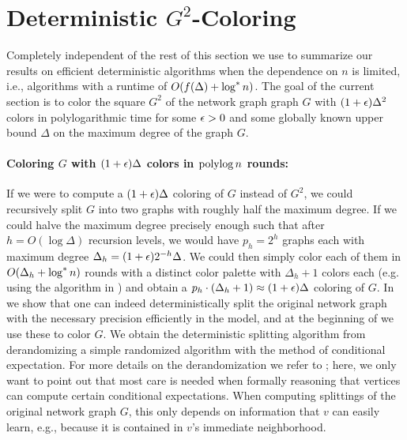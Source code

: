 \section{Deterministic $G^2$-Coloring}
\label{S:det-diam}
Completely independent of the rest of this section we use  to summarize our results on efficient deterministic algorithms when the dependence on $n$ is limited, i.e., algorithms with a runtime of $O(f(\Delta)+\log^* n)$. 
The goal of the current section is to color the square $G^2$ of the network graph graph $G$ with $(1+\epsilon)\Delta^2$ colors in polylogarithmic time for some $\epsilon>0$ and some globally known upper bound $\Delta$ on the maximum degree of the graph $G$. 

\paragraph{Coloring $G$ with $(1+\epsilon)\Delta$ colors in $\operatorname{polylog} n$ rounds:} If we were to compute a $(1+\epsilon)\Delta$ coloring of $G$ instead of $G^2$, we could recursively split $G$ into two graphs with roughly half the maximum degree. If we could halve the maximum degree precisely enough such that after $h=O(\log \Delta)$ recursion levels, we would have $p_h=2^h$ graphs each with maximum degree $\Delta_h=(1+\epsilon)2^{-h}\Delta$. We could then simply color each of them in $O(\Delta_h+\log^* n)$ rounds with a distinct color palette with $\Delta_h+1$ colors each (e.g. using the algorithm in \cite{BEG18}) and obtain a $p_h\cdot (\Delta_h+1)\approx(1+\epsilon)\Delta$ coloring of $G$. In  we show that one can indeed deterministically split the original network graph with the necessary precision efficiently in the {\congest} model, and at the beginning of  we use these to color $G$.  We obtain the deterministic splitting algorithm from derandomizing a simple randomized algorithm with the method of conditional expectation. For more details on the derandomization we refer to ; here, we only want to point out that most care is needed when formally reasoning that vertices can compute certain conditional expectations. When computing splittings of the original network graph $G$,
this only depends on information that $v$ can easily learn, e.g., because it is contained in $v$'s immediate neighborhood. 


